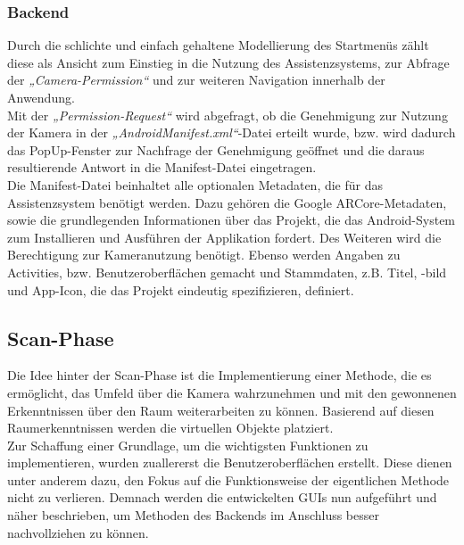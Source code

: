 \subsubsection{Backend}
Durch die schlichte und einfach gehaltene Modellierung des Startmenüs zählt diese als Ansicht zum Einstieg in die Nutzung des Assistenzsystems, zur Abfrage der 
\textit{„Camera-Permission“} und zur weiteren Navigation innerhalb der Anwendung.
\\ 
Mit der \textit{„Permission-Request“} wird abgefragt, ob die Genehmigung zur Nutzung der Kamera in der \textit{„AndroidManifest.xml“}-Datei erteilt wurde, bzw. 
wird dadurch das PopUp-Fenster zur Nachfrage der Genehmigung geöffnet und die daraus resultierende Antwort in die Manifest-Datei eingetragen. 
\\ 
\linebreak
Die Manifest-Datei beinhaltet alle optionalen Metadaten, die für das Assistenzsystem benötigt werden. Dazu gehören die Google ARCore-Metadaten, sowie die 
grundlegenden Informationen über das Projekt, die das Android-System zum Installieren und Ausführen der Applikation fordert. Des Weiteren wird 
die Berechtigung zur Kameranutzung benötigt. Ebenso werden Angaben zu Activities, bzw. Benutzeroberflächen gemacht und Stammdaten, z.B. Titel, -bild und 
App-Icon, die das Projekt eindeutig spezifizieren, definiert.

\subsection{Scan-Phase} %
\label{chap:scan_implementation}
Die Idee hinter der Scan-Phase ist die Implementierung einer Methode, die es ermöglicht, das Umfeld über die Kamera wahrzunehmen und mit den gewonnenen 
Erkenntnissen über den Raum weiterarbeiten zu können. Basierend auf diesen Raumerkenntnissen werden die virtuellen Objekte platziert. 
\\ 
Zur Schaffung einer Grundlage, um die wichtigsten Funktionen zu implementieren, wurden zuallererst die Benutzeroberflächen erstellt. Diese dienen 
unter anderem dazu, den Fokus auf die Funktionsweise der eigentlichen Methode nicht zu verlieren. Demnach werden die entwickelten \acs{GUI}s nun aufgeführt 
und näher beschrieben, um Methoden des Backends im Anschluss besser nachvollziehen zu können.
